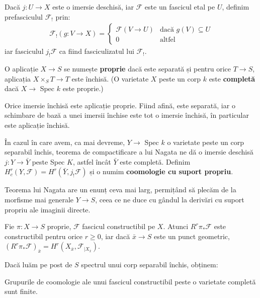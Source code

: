 \documentclass[13pt,openany]{book}
\begin{document}
Dacă $j :U \rightarrow X$ este o imersie deschisă, iar $\mathcal{F}$ este un fascicul etal pe $U$, definim prefasciculul $\mathcal{F}_!$ prin:
\begin{align*}
\mathcal{F}_!(g: V \rightarrow X) = \left\{
     \begin{array}{lr}
       \mathcal{F}(V \rightarrow U) & \text{dacă } g(V)\subseteq U\\
       0 & \text{altfel}
     \end{array}
   \right.
\end{align*}
iar fasciculul $j_!\mathcal{F}$ ca fiind fasciculizatul lui $\mathcal{F}_!$.

O aplicație $X \rightarrow S$ se numește {\bf proprie} dacă este separată și pentru orice $T \rightarrow S$, aplicația $X \times_S T \rightarrow T$ este închisă. (O varietate $X$ peste un corp $k$ este {\bf completă} dacă $X \rightarrow$ Spec $k$ este proprie.)

Orice imersie închisă este aplicație proprie. Fiind afină, este separată, iar o schimbare de bază a unei imersii închise este tot o imersie închisă, în particular este aplicație închisă.

În cazul în care avem, ca mai devreme, $Y \rightarrow$ Spec $k$ o varietate peste un corp separabil închis, teorema de compactificare a lui Nagata ne dă o imersie deschisă $j: Y \rightarrow \bar{Y}$ peste Spec $K$, astfel încât $\bar{Y}$ este completă. Definim $H^r_c(Y,\mathcal{F}) = H^r(\bar{Y},j_!\mathcal{F})$ și o numim {\bf coomologie cu suport propriu}.

Teorema lui Nagata are un enunț ceva mai larg, permițând să plecăm de la morfisme mai generale $Y \rightarrow S$, ceea ce ne duce cu gândul la derivări cu suport propriu ale imaginii directe.

\begin{teo}
Fie $\pi: X \rightarrow S$ proprie, $\mathcal{F}$ fascicul constructibil pe $X$. Atunci $R^r\pi_*\mathcal{F}$ este constructibil pentru orice $r \geq 0$, iar dacă $\bar{x} \rightarrow S$ este un punct geometric, $(R^r\pi_*\mathcal{F})_{\bar{x}} = H^r(X_{\bar{x}},\mathcal{F}_{\mid X_{\bar{x}}})$.
\end{teo}

Dacă luăm pe post de $S$ spectrul unui corp separabil închis, obținem:

\begin{cor}
Grupurile de coomologie ale unui fascicul constructibil peste o varietate completă sunt finite.
\end{cor}
\end{document}
